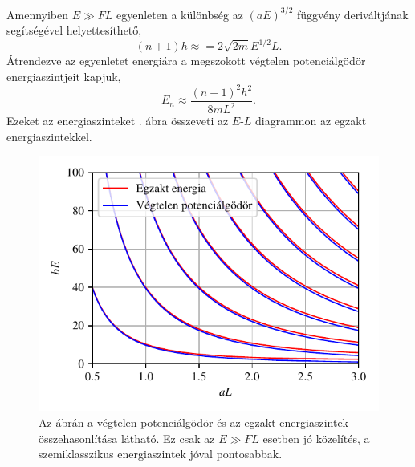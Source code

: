 Amennyiben $E \gg FL$  egyenleten a különbség az $(aE)^{3/2}$ függvény deriváltjának segítségével helyettesíthető,
\begin{equation}
	(n+1)h \approx =2\sqrt{2m}E^{1/2}L.
\end{equation}
Átrendezve az egyenletet energiára a megszokott végtelen potenciálgödör energiaszintjeit kapjuk,
\begin{equation}
	E_n \approx \frac{(n+1)^2h^2}{8mL^2}.
\end{equation}
Ezeket az energiaszinteket . ábra összeveti az $E$-$L$ diagrammon az egzakt energiaszintekkel.
\begin{figure}[H]
	\centering
	\includegraphics[scale=1]{./figs/infsquareenergia.pdf}
	\caption[Végtelen potenciálgödör energiaszintjei]{Az ábrán a végtelen potenciálgödör és az egzakt energiaszintek összehasonlítása látható. Ez csak az $E \gg FL$ esetben jó közelítés, a szemiklasszikus energiaszintek jóval pontosabbak.}
	\label{semiclassicallevels:squarewell}
\end{figure}